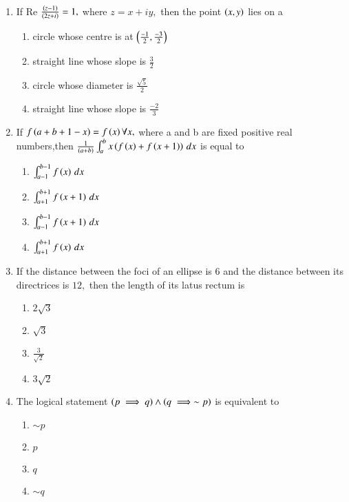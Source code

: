 \documentclass[journal,12pt,twocolumn]{IEEEtran}
\theoremstyle{remark}
\begin{document}
\begin{enumerate}
    \item If Re $\frac{\left(z-1\right)}{\left(2z+i\right)}=1,$ where $z=x+iy,$ then the point $\left(x,y\right)$ lies on a 
    \begin{enumerate}
        \item circle whose centre is at $\left(\frac{-1}{2},\frac{-3}{2}\right)$
        \item straight line whose slope is $\frac{3}{2}$
        \item circle whose diameter is $\frac{\sqrt{5}}{2}$
        \item straight line whose slope is $\frac{-2}{3}$\\
    \end{enumerate}
    \item If $f\left(a+b+1-x\right)=f\left(x\right)\forall{x},$ where a and b are fixed positive real numbers,then $\frac{1}{\left(a+b\right)}\int_{a}^{b}x\left(f\left(x\right)+f\left(x+1\right)\right)\,dx$
    is equal to
    \begin{enumerate}
        \item $\int_{a-1}^{b-1}f\left(x\right)\,dx$
        \item $\int_{a+1}^{b+1}f\left(x+1\right)\,dx$
        \item $\int_{a-1}^{b-1}f\left(x+1\right)\,dx$
        \item  $\int_{a+1}^{b+1}f\left(x\right)\,dx$\\
    \end{enumerate}
    \item  If the distance between the foci of an ellipse is $6$ and the distance between its directrices is $12,$ then the length of its latus rectum is
    \begin{enumerate}
        \item $2\sqrt{3}$
        \item $\sqrt{3}$
        \item $\frac{3}{\sqrt{2}}$
        \item $3\sqrt{2}$\\
    \end{enumerate}
    \item  The logical statement $\left(p\implies q\right)\land \left(q\implies\sim p\right)$ is equivalent to
    \begin{enumerate}
        \item $\sim p$
        \item $p$
        \item $q$
        \item $\sim q$\\
    \end{enumerate}

\end{enumerate}
\end{document}
